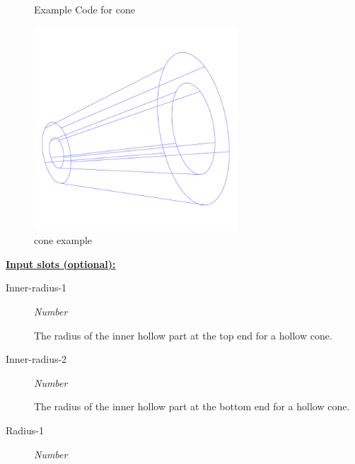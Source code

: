 \documentclass [11pt]{book}
\begin{document}
\begin{itemize}
\begin{figure}
\begin{lrbox}{\boxedverb}
\begin{minipage}{\linewidth}
{\begin{verbatim}
\end{verbatim}}
\end{minipage}
\end{lrbox}
\fbox{\usebox{\boxedverb}}

\caption{Example Code for cone}

\label{fig:example-code-cone}

\end{figure}

\begin{figure}
\begin{center}
\includegraphics[width=3in,height=3in]{../images/example-cone.pdf}
\end{center}

\caption{cone example}

\label{fig:cone}

\end{figure}





\textbf{
\underline{Input slots (optional):}}

\begin{description}

\item [Inner-radius-1]
\emph{Number}

 The radius of the inner hollow part at the top end for a hollow cone.




\item [Inner-radius-2]
\emph{Number}

 The radius of the inner hollow part at the bottom end for a hollow cone.




\item [Radius-1]
\emph{Number}


\end{description}
\end{itemize}
\end{document}
